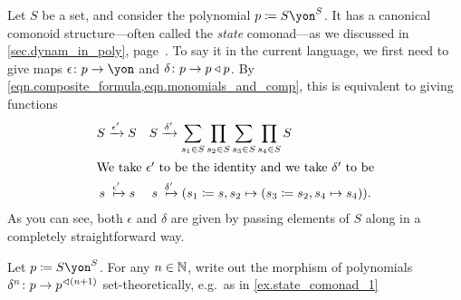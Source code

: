 \documentclass[DynamicalBook]{subfiles}
\begin{document}
\begin{example}\label{ex.state_comonad_1}
Let $S$ be a set, and consider the polynomial $p\coloneqq S\yon^S$. It has a canonical comonoid structure---often called the \emph{state} comonad---as we discussed in \cref{sec.dynam_in_poly}, page~\pageref{page.poly_comonad}. To say it in the current language, we first need to give maps $\epsilon\colon p\to \yon$ and $\delta\colon p\to p\mathbin{\triangleleft} p$. By \cref{eqn.composite_formula,eqn.monomials_and_comp}, this is equivalent to giving functions
\begin{align}\nonumber
	S&\To{\epsilon'} S&
	S&\To{\delta'}\sum_{s_1\in S}\prod_{s_2\in S}\sum_{s_3\in S}\prod_{s_4\in S}S\\
\intertext{We take $\epsilon'$ to be the identity and we take $\delta'$ to be}
	s&\Mapsto{\epsilon'} s&
  s&\Mapsto{\delta'} (s_1\coloneqq s, s_2\mapsto (s_3\coloneqq s_2, s_4\mapsto s_4)).\label{eqn.state_comonoid_eps_del}
\end{align}
As you can see, both $\epsilon$ and $\delta$ are given by passing elements of $S$ along in a completely straightforward way.
\end{example}

\begin{exercise}
Let $p\coloneqq S\yon^S$. For any $n\in\mathbb{N}$, write out the morphism of polynomials $\delta^n\colon p\to p^{\lhd (n+1)}$ set-theoretically, e.g.\ as in \cref{ex.state_comonad_1}
\end{exercise}
\end{document}
